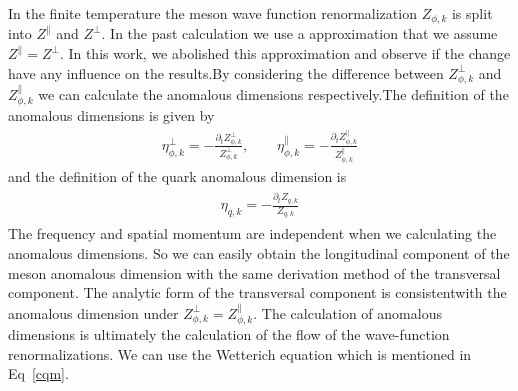 \documentclass[%
reprint,
superscriptaddress,
showpacs,preprintnumbers,
 amsmath,amssymb,
 aps,
prd,
]{revtex4-1}
\begin{document}
In the finite temperature the meson wave function renormalization $Z_{\phi,k}$ is split into $Z^\|$ and $Z^\bot$. In the past 
calculation we use a approximation that we assume $Z^\|=Z^\bot$. In this work, we abolished this approximation and observe if the 
change have any influence on the results.By considering the difference between $Z^\bot_{\phi,k}$ and $Z^\|_{\phi,k}$ we can calculate 
the anomalous dimensions respectively.The definition of the anomalous dimensions is given by
\begin{align}
\eta_{\phi,k}^\bot=-\frac{\partial_tZ_{\phi,k}^\bot}{Z_{\phi,k}^\bot} ,\qquad \eta_{\phi,k}^\|=-\frac{\partial_tZ_{\phi,k}^\|}
{Z_{\phi,k}^\|}\label{eq:anodim}
\end{align}
and the definition of the quark anomalous dimension is
\begin{align}
\begin{split}
\eta_{q,k}=-\frac{\partial_tZ_{q,k}}{Z_{q,k}}
\end{split}
\end{align}
The frequency and spatial momentum are independent when we calculating the anomalous dimensions. So we can easily obtain the 
longitudinal component of the meson anomalous dimension with the same derivation method of the transversal component. The 
analytic form of the transversal component is consistentwith the anomalous dimension under $Z^{\bot}_{\phi,k}=Z^{\|}_{\phi,k}$. The 
calculation of anomalous dimensions is ultimately the calculation of the flow of the 
wave-function renormalizations. We can use the Wetterich equation which is mentioned in Eq~\ref{cqm}.
\end{document}
